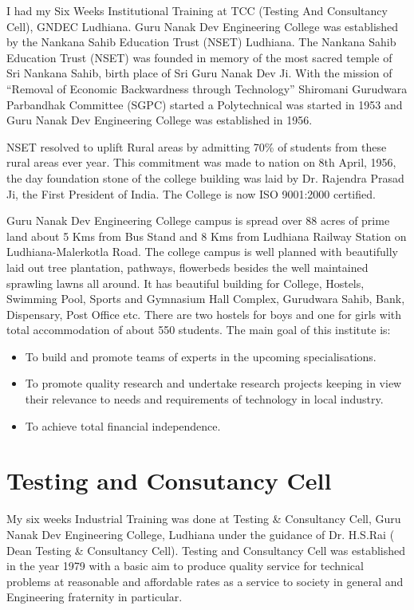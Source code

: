 
I had my Six Weeks Institutional Training at TCC (Testing And 
Consultancy Cell), GNDEC Ludhiana. Guru Nanak Dev Engineering College 
was established by the Nankana Sahib Education Trust (NSET) Ludhiana. 
The Nankana Sahib Education Trust (NSET) was founded in memory of the 
most sacred temple of Sri Nankana Sahib, birth place of Sri Guru Nanak 
Dev Ji. With the mission of “Removal of Economic Backwardness through 
Technology” Shiromani Gurudwara Parbandhak Committee (SGPC) started a 
Polytechnical was started in 1953 and Guru Nanak Dev Engineering 
College was established in 1956.

NSET resolved to uplift Rural areas by admitting 70\% of students from 
these rural areas ever year. This commitment was made to nation on 8th 
April, 1956, the day foundation stone of the college building was laid 
by Dr. Rajendra Prasad Ji, the First President of India. The College is
now ISO 9001:2000 certified.


Guru Nanak Dev Engineering College campus is spread over 88 acres of 
prime land about 5 Kms from Bus Stand and 8 Kms from Ludhiana Railway 
Station on Ludhiana-Malerkotla Road. The college campus is well planned 
with beautifully laid out tree plantation, pathways, flowerbeds besides 
the well maintained sprawling lawns all around. It has beautiful 
building for College, Hostels, Swimming Pool, Sports and Gymnasium Hall 
Complex, Gurudwara Sahib, Bank, Dispensary, Post Office etc. There are 
two hostels for boys and one for girls with total accommodation of about 
550 students. The main goal of this institute is:
\begin{itemize}
\item To build and promote teams of experts in the upcoming 
specialisations.
\item To promote quality research and undertake research projects 
keeping in view their relevance to needs and requirements of technology 
in local industry.
\item To achieve total financial independence.
\end{itemize}

\section{Testing and Consutancy Cell}
My six weeks Industrial Training was done at Testing \& Consultancy Cell,
Guru Nanak Dev Engineering College, Ludhiana under the guidance of 
Dr. H.S.Rai ( Dean Testing \& Consultancy Cell). Testing and 
Consultancy Cell was established in the year 1979 with a basic aim to 
produce quality service for technical problems at reasonable and 
affordable rates as a service to society in general and Engineering 
fraternity in particular.\\ \\

